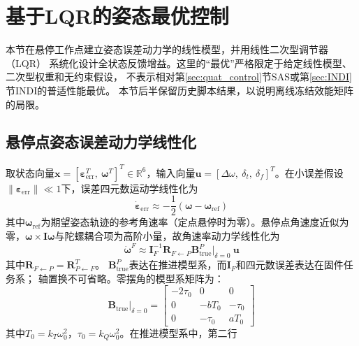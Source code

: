 \section{基于LQR的姿态最优控制}
\label{sec:lqr}

本节在悬停工作点建立姿态误差动力学的线性模型，并用线性二次型调节器（LQR）
系统化设计全状态反馈增益。这里的“最优”严格限定于给定线性模型、二次型权重和无约束假设，
不表示相对第\ref{sec:quat_control}节SAS或第\ref{sec:INDI}节INDI的普适性能最优。
本节后半保留历史脚本结果，以说明离线冻结效能矩阵的局限。

\subsection{悬停点姿态误差动力学线性化}
\label{sec:lqr_model}

取状态向量$\mathbf{x}=[\boldsymbol{\varepsilon}_{\mathrm{err}}^T,\ \boldsymbol{\omega}^T]^T\in\mathbb{R}^6$，输入向量$\mathbf{u}=[\Delta\omega,\ \delta_t,\ \delta_f]^T$。在小误差假设$\|\boldsymbol{\varepsilon}_{\mathrm{err}}\|\ll 1$下，误差四元数运动学线性化为
\begin{equation}
    \dot{\boldsymbol{\varepsilon}}_{\mathrm{err}} \approx -\frac{1}{2}\left(\boldsymbol{\omega} - \boldsymbol{\omega}_{\mathrm{ref}}\right)
    \label{eq:lqr_eps_dot}
\end{equation}
其中$\boldsymbol{\omega}_{\mathrm{ref}}$为期望姿态轨迹的参考角速率（定点悬停时为零）。悬停点角速度近似为零，$\boldsymbol{\omega}\times\mathbf{I}\boldsymbol{\omega}$与陀螺耦合项为高阶小量，故角速率动力学线性化为
\begin{equation}
    \dot{\boldsymbol{\omega}}^F \approx
    \mathbf{I}_F^{-1}\mathbf{R}_{F\leftarrow P}
    \mathbf{B}_{\mathrm{true}}^P\big|_{\delta=0}\ \mathbf{u}
    \label{eq:lqr_omega_dot}
\end{equation}
其中$\mathbf R_{F\leftarrow P}=\mathbf R_{P\leftarrow F}^{T}$。
$\mathbf B_{\mathrm{true}}^P$表达在推进模型系，而$\mathbf I_F$和四元数误差表达在固件任务系；
轴置换不可省略。零摆角的模型系矩阵为：
\begin{equation}
    \mathbf{B}_{\mathrm{true}}\big|_{\delta=0} =
    \begin{bmatrix}
        -2\tau_0 & 0 & 0 \\
        0 & -bT_0 & -\tau_0 \\
        0 & -\tau_0 & aT_0
    \end{bmatrix}
    \label{eq:B_hover}
\end{equation}
其中$T_0=k_T\omega_0^2$，$\tau_0=k_Q\omega_0^2$。在推进模型系中，第二行
